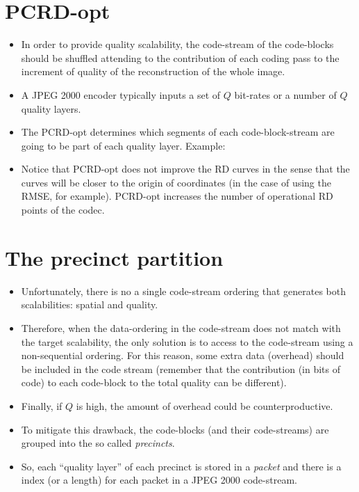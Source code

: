 \section*{PCRD-opt}
\begin{itemize}
\item In order to provide quality scalability, the code-stream of the
  code-blocks should be shuffled attending to the contribution of each
  coding pass to the increment of quality of the reconstruction of the
  whole image.
\item A JPEG 2000 encoder typically inputs a set of $Q$ bit-rates or a
  number of $Q$ quality layers.
\item The PCRD-opt determines which segments of each code-block-stream
  are going to be part of each quality layer. Example:
\begin{center}
\end{center}
\item Notice that PCRD-opt does not improve the RD curves in the sense
  that the curves will be closer to the origin of coordinates (in the
  case of using the RMSE, for example). PCRD-opt increases the number
  of operational RD points of the codec.
\end{itemize}

\section*{The precinct partition}
\begin{itemize}
\item Unfortunately, there is no a single code-stream ordering that
  generates both scalabilities: spatial and quality.
\item Therefore, when the data-ordering in the code-stream does not
  match with the target scalability, the only solution is to access to
  the code-stream using a non-sequential ordering. For this reason,
  some extra data (overhead) should be included in the code stream
  (remember that the contribution (in bits of code) to each code-block
  to the total quality can be different).
\item Finally, if $Q$ is high, the amount of overhead could be
  counterproductive.
\item To mitigate this drawback, the code-blocks (and their
  code-streams) are grouped into the so called \emph{precincts}.
\item So, each ``quality layer'' of each precinct is stored in a
  \emph{packet} and there is a index (or a length) for each packet in
  a JPEG 2000 code-stream.
\end{itemize}
\begin{center}
\end{center}


